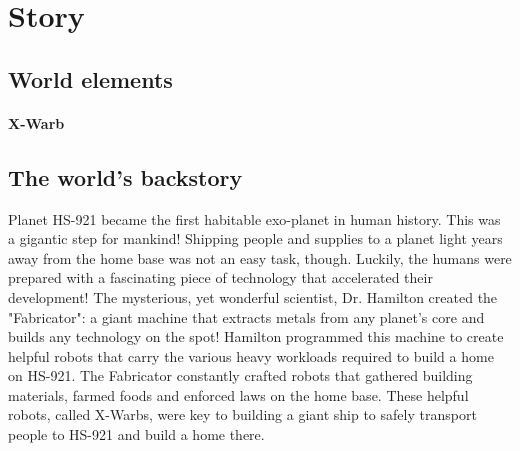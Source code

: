 \documentclass[../Main.tex]{subfiles}
\begin{document}
\section{Story}


\subsection{World elements}

\paragraph{X-Warb} 


\subsection{The world's backstory}

Planet HS-921 became the first habitable exo-planet in human history. This was a gigantic step for mankind! Shipping people and supplies to a planet light years away from the home base was not an easy task, though. Luckily, the humans were prepared with a fascinating piece of technology that accelerated their development! The mysterious, yet wonderful scientist, Dr. Hamilton created the "Fabricator": a giant machine that extracts metals from any planet's core and builds any technology on the spot! Hamilton programmed this machine to create helpful robots that carry the various heavy workloads required to build a home on HS-921. The Fabricator constantly crafted robots that gathered building materials, farmed foods and enforced laws on the home base. These helpful robots, called X-Warbs, were key to building a giant ship to safely transport people to HS-921 and build a home there. 
\end{document}
